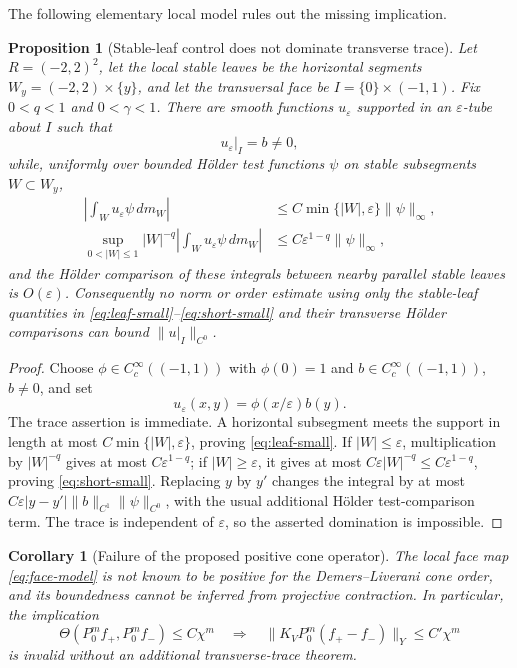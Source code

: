 \documentclass[11pt]{article}
\newtheorem{proposition}[theorem]{Proposition}
\newtheorem{corollary}[theorem]{Corollary}
\begin{document}
The following elementary local model rules out the missing implication.

\begin{proposition}[Stable-leaf control does not dominate transverse trace]
\label{prop:no-trace}
Let $R=(-2,2)^2$, let the local stable leaves be the horizontal segments
$W_y=(-2,2)\times\{y\}$, and let the transversal face be
$I=\{0\}\times(-1,1)$.  Fix $0<q<1$ and $0<\gamma<1$.  There are smooth
functions $u_\varepsilon$ supported in an $\varepsilon$-tube about $I$ such
that
\[
 u_\varepsilon\vert_I=b\ne0,
\]
while, uniformly over bounded H\"older test functions $\psi$ on stable
subsegments $W\subset W_y$,
\begin{align}
 \left|\int_Wu_\varepsilon\psi\,dm_W\right|
 &\le C\min\{|W|,\varepsilon\}\|\psi\|_\infty,
       \label{eq:leaf-small}\\
 \sup_{0<|W|\le1}|W|^{-q}
 \left|\int_Wu_\varepsilon\psi\,dm_W\right|
 &\le C\varepsilon^{1-q}\|\psi\|_\infty,\label{eq:short-small}
\end{align}
and the H\"older comparison of these integrals between nearby parallel
stable leaves is $O(\varepsilon)$.  Consequently no norm or order estimate
using only the stable-leaf quantities in
\eqref{eq:leaf-small}--\eqref{eq:short-small} and their transverse H\"older
comparisons can bound $\|u\vert_I\|_{C^0}$.
\end{proposition}

\begin{proof}
Choose $\phi\in C_c^\infty((-1,1))$ with $\phi(0)=1$ and
$b\in C_c^\infty((-1,1))$, $b\ne0$, and set
\[
  u_\varepsilon(x,y)=\phi(x/\varepsilon)b(y).
\]
The trace assertion is immediate.  A horizontal subsegment meets the support
in length at most $C\min\{|W|,\varepsilon\}$, proving
\eqref{eq:leaf-small}.  If $|W|\le\varepsilon$, multiplication by
$|W|^{-q}$ gives at most $C\varepsilon^{1-q}$; if
$|W|\ge\varepsilon$, it gives at most
$C\varepsilon|W|^{-q}\le C\varepsilon^{1-q}$, proving
\eqref{eq:short-small}.  Replacing $y$ by $y'$ changes the integral by at most
$C\varepsilon|y-y'|\|b\|_{C^1}\|\psi\|_{C^0}$, with the usual additional
H\"older test-comparison term.  The trace is independent of
$\varepsilon$, so the asserted domination is impossible.
\end{proof}

\begin{corollary}[Failure of the proposed positive cone operator]
The local face map \eqref{eq:face-model} is not known to be positive for the
Demers--Liverani cone order, and its boundedness cannot be inferred from
projective contraction.  In particular, the implication
\[
 \Theta(P_0^mf_+,P_0^mf_-)\le C\chi^m
 \quad\Longrightarrow\quad
 \|K_VP_0^m(f_+-f_-)\|_Y\le C'\chi^m
\]
is invalid without an additional transverse-trace theorem.
\end{corollary}
\end{document}

